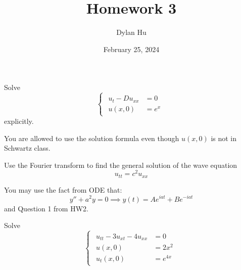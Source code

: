 \documentclass[plain]{pset}
\title{Homework 3}
\author{Dylan Hu}
\date{February 25, 2024}
\begin{document}
\begin{multicols}{2}
    \raggedcolumns{}
    \maketitle
    \columnbreak{}
    \tableofcontents
\end{multicols}

\setlength{\parskip}{1em}

\pagebreak

\begin{problem}
Solve
\[\begin{cases}\begin{aligned}
            u_t - Du_{xx} & = 0   \\
            u(x, 0)       & = e^x
        \end{aligned}\end{cases}\]
explicitly.
\begin{remark*}
    You are allowed to use the solution formula even though \(u(x, 0)\) is not in Schwartz class.
\end{remark*}
\end{problem}
\begin{solution}

\end{solution}

\pagebreak

\begin{problem}
Use the Fourier transform to find the general solution of the wave equation
\[u_{tt} = c^2u_{xx}\]
\begin{hint*}
    You may use the fact from ODE that:
    \[y'' + a^2y = 0 \implies y(t) = Ae^{iat} + Be^{-iat}\]
    and Question 1 from HW2.
\end{hint*}
\end{problem}
\begin{solution}

\end{solution}

\pagebreak

\begin{problem}
Solve
\[\begin{cases}\begin{aligned}
            u_{tt} - 3u_{xt} - 4u_{xx} & = 0      \\
            u(x, 0)                    & = 2x^2   \\
            u_t(x, 0)                  & = e^{4x}
        \end{aligned}\end{cases}\]
\end{problem}
\begin{solution}

\end{solution}
\end{document}
